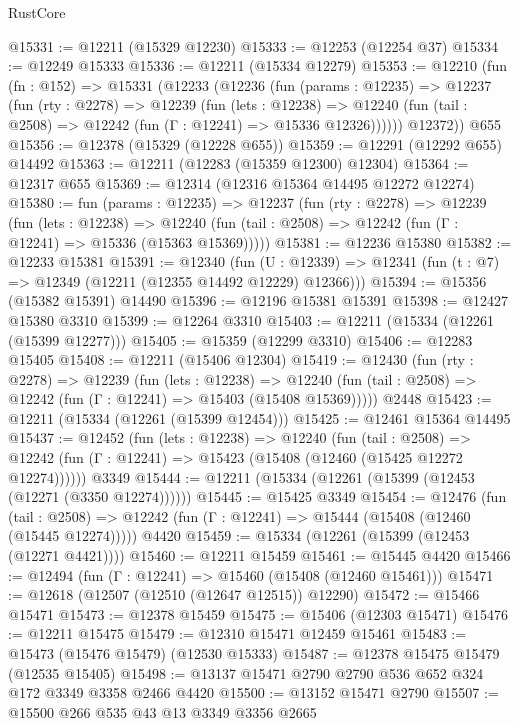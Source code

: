 \begin{lexlean}{RustCore}
\begin{coremodule}
@15331 := @12211 (@15329 @12230)
@15333 := @12253 (@12254 @37)
@15334 := @12249 @15333
@15336 := @12211 (@15334 @12279)
@15353 := @12210
    (fun (fn : @152) =>
    @15331
      (@12233
        (@12236
          (fun (params : @12235) =>
          @12237
            (fun (rty : @2278) =>
            @12239
              (fun (lets : @12238) =>
              @12240 (fun (tail : @2508) => @12242 (fun (Γ : @12241) => @15336 @12326))))))
        @12372))
    @655
@15356 := @12378 (@15329 (@12228 @655))
@15359 := @12291 (@12292 @655) @14492
@15363 := @12211 (@12283 (@15359 @12300) @12304)
@15364 := @12317 @655
@15369 := @12314 (@12316 @15364 @14495 @12272 @12274)
@15380 := fun (params : @12235) =>
  @12237
    (fun (rty : @2278) =>
    @12239
      (fun (lets : @12238) =>
      @12240 (fun (tail : @2508) => @12242 (fun (Γ : @12241) => @15336 (@15363 @15369)))))
@15381 := @12236 @15380
@15382 := @12233 @15381
@15391 := @12340
    (fun (U : @12339) => @12341 (fun (t : @7) => @12349 (@12211 (@12355 @14492 @12229) @12366)))
@15394 := @15356 (@15382 @15391) @14490
@15396 := @12196 @15381 @15391
@15398 := @12427 @15380 @3310
@15399 := @12264 @3310
@15403 := @12211 (@15334 (@12261 (@15399 @12277)))
@15405 := @15359 (@12299 @3310)
@15406 := @12283 @15405
@15408 := @12211 (@15406 @12304)
@15419 := @12430
    (fun (rty : @2278) =>
    @12239
      (fun (lets : @12238) =>
      @12240 (fun (tail : @2508) => @12242 (fun (Γ : @12241) => @15403 (@15408 @15369)))))
    @2448
@15423 := @12211 (@15334 (@12261 (@15399 @12454)))
@15425 := @12461 @15364 @14495
@15437 := @12452
    (fun (lets : @12238) =>
    @12240
      (fun (tail : @2508) =>
      @12242 (fun (Γ : @12241) => @15423 (@15408 (@12460 (@15425 @12272 @12274))))))
    @3349
@15444 := @12211 (@15334 (@12261 (@15399 (@12453 (@12271 (@3350 @12274))))))
@15445 := @15425 @3349
@15454 := @12476
    (fun (tail : @2508) => @12242 (fun (Γ : @12241) => @15444 (@15408 (@12460 (@15445 @12274)))))
    @4420
@15459 := @15334 (@12261 (@15399 (@12453 (@12271 @4421))))
@15460 := @12211 @15459
@15461 := @15445 @4420
@15466 := @12494 (fun (Γ : @12241) => @15460 (@15408 (@12460 @15461)))
@15471 := @12618 (@12507 (@12510 (@12647 @12515)) @12290)
@15472 := @15466 @15471
@15473 := @12378 @15459
@15475 := @15406 (@12303 @15471)
@15476 := @12211 @15475
@15479 := @12310 @15471 @12459 @15461
@15483 := @15473 (@15476 @15479) (@12530 @15333)
@15487 := @12378 @15475 @15479 (@12535 @15405)
@15498 := @13137 @15471 @2790 @2790 @536 @652 @324 @172 @3349 @3358 @2466 @4420
@15500 := @13152 @15471 @2790
@15507 := @15500 @266 @535 @43 @13 @3349 @3356 @2665

\end{coremodule}
\end{lexlean}
